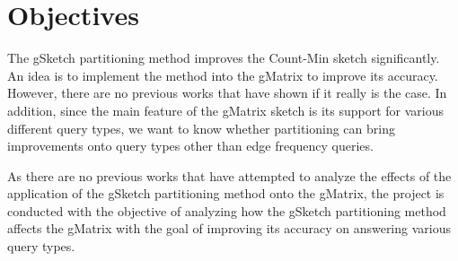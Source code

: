 \section{Objectives} %

The gSketch partitioning method improves the Count-Min sketch significantly. An idea is to implement the method into the gMatrix \cite{khan} to improve its accuracy. However, there are no previous works that have shown if it really is the case. In addition, since the main feature of the gMatrix sketch is its support for various different query types, we want to know whether partitioning can bring improvements onto query types other than edge frequency queries.

As there are no previous works that have attempted to analyze the effects of the application of the gSketch partitioning method onto the gMatrix, the project is conducted with the objective of analyzing how the gSketch\cite{DBLP} partitioning method affects the gMatrix\cite{khan} with the goal of improving its accuracy on answering various query types.
